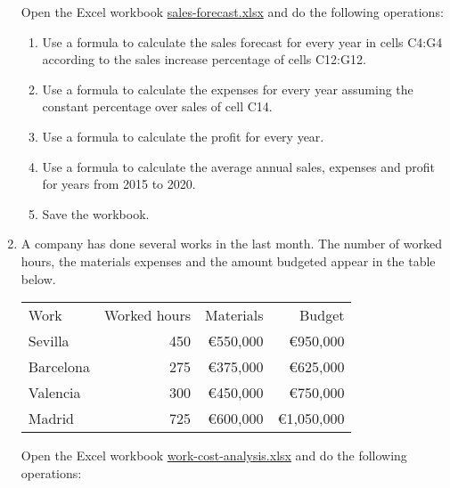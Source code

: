 \begin{enumerate}[leftmargin=*,resume]
Open the Excel workbook
\href{http://aprendeconalf.es/office/excel/exercises/formulas/sales-forecast.xlsx}{\textsf{sales-forecast.xlsx}} and do
the following operations:

\begin{enumerate}
\item Use a formula to calculate the sales forecast for every year in cells C4:G4 according to the sales increase percentage of
cells C12:G12.
\item Use a formula to calculate the expenses for every year assuming the constant percentage over sales of cell C14.
\item Use a formula to calculate the profit for every year. 
\item Use a formula to calculate the average annual sales, expenses and profit for years from 2015 to 2020.
\item Save the workbook.
\end{enumerate}

\item A company has done several works in the last month. The number of worked hours, the materials expenses and the
amount budgeted appear in the table below.

\begin{center}
\begin{tabular}{lrrr}
\toprule
Work & Worked hours & Materials & Budget \\
Sevilla	  & 450	& €550,000 & €950,000\\ 
Barcelona &	275	& €375,000 & €625,000\\ 
Valencia  & 300 & €450,000 & €750,000\\ 
Madrid    & 725	& €600,000 & €1,050,000\\ 
\bottomrule
\end{tabular}
\end{center}

Open the Excel workbook
\href{http://aprendeconalf.es/office/excel/exercises/formulas/work-cost-analysis.xlsx}{\textsf{work-cost-analysis.xlsx}}
and do the following operations:


\end{enumerate}
